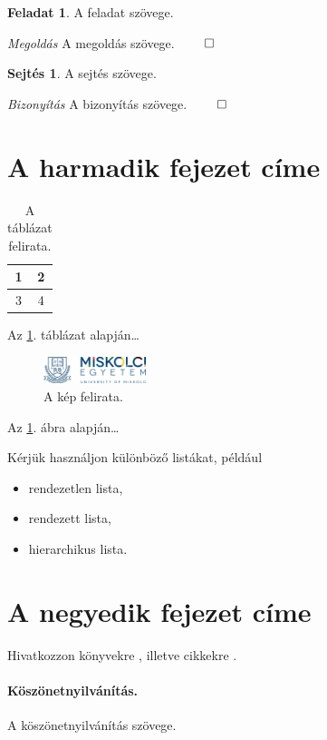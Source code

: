 \documentclass[a4paper,12pt]{article}
\theoremstyle{definition}
\newtheorem{exercise}[theorem]{Feladat}%
\newtheorem{conjecture}[theorem]{Sejtés}%
\renewenvironment{proof}[1][]{\noindent\textit{Bizonyítás} }{$\qed$}
\newenvironment{solution}[1][]{\noindent\textit{Megoldás} }{$\qed$}
\begin{document}
\begin{exercise}
A feladat szövege. 
\end{exercise}

\begin{solution}
A megoldás szövege. 
\end{solution}

\begin{conjecture}
A sejtés szövege. 
\end{conjecture}

\begin{proof}
A bizonyítás szövege. 
\end{proof}

\section{A harmadik fejezet címe}

\begin{table}[!ht] %
  \centering
  \caption{A táblázat felirata.}\label{table:Key3}
  \medskip
  \begin{tabular}{|c|c|}
    \hline
    1 & 2 \\
    \hline
    3 & 4 \\
    \hline
  \end{tabular}
\end{table}

Az \ref{table:Key3}. táblázat alapján\dots

\begin{figure}[!ht] %
  \centering
  \includegraphics[width=3cm]{ME_Logo.png}
  \caption{A kép felirata.}\label{figure:Key4}
\end{figure}

Az \ref{figure:Key4}. ábra alapján\dots

Kérjük használjon különböző listákat, például
\begin{itemize}
\item rendezetlen lista,
\item rendezett lista,
\item hierarchikus lista.
\end{itemize}

\section{A negyedik fejezet címe}%

Hivatkozzon könyvekre \cite{erdos2013}, illetve cikkekre \cite{aczel1983}.

\paragraph{Köszönetnyilvánítás.} A köszönetnyilvánítás szövege.



\end{document}
